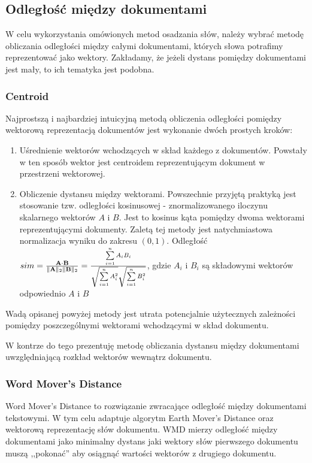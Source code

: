 \documentclass[pl]{minipw} %
\begin{document}
\subsection{Odległość między dokumentami}
W celu wykorzystania omówionych metod osadzania słów, należy wybrać metodę obliczania odległości między całymi dokumentami, których słowa potrafimy reprezentować jako wektory. Zakładamy, że jeżeli dystans pomiędzy dokumentami jest mały, to ich tematyka jest podobna.
\subsubsection{Centroid}
Najprostszą i najbardziej intuicyjną metodą obliczenia odległości pomiędzy wektorową reprezentacją dokumentów jest wykonanie dwóch prostych kroków:
\begin{enumerate}
	\item Uśrednienie wektorów wchodzących w skład każdego z dokumentów. Powstały w ten sposób wektor jest centroidem reprezentującym dokument w przestrzeni wektorowej.
	\item Obliczenie dystansu między wektorami. Powszechnie przyjętą praktyką jest stosowanie tzw. odległości kosinusowej - znormalizowanego iloczynu skalarnego wektorów $A$ i $B$. Jest to kosinus kąta pomiędzy dwoma wektorami reprezentującymi dokumenty. Zaletą tej metody jest natychmiastowa normalizacja wyniku do zakresu $(0, 1)$. Odległość $sim={\mathbf {A} \cdot \mathbf {B}  \over \|\mathbf {A} \|_{2}\|\mathbf {B} \|_{2}}={\frac {\sum \limits _{i=1}^{n}{A_{i}B_{i}}}{{\sqrt {\sum \limits _{i=1}^{n}{A_{i}^{2}}}}{\sqrt {\sum \limits _{i=1}^{n}{B_{i}^{2}}}}}}$,
	gdzie $A_i$ i $B_i$ są składowymi wektorów odpowiednio $A$ i $B$
\end{enumerate}
Wadą opisanej powyżej metody jest utrata potencjalnie użytecznych zależności pomiędzy poszczególnymi wektorami wchodzącymi w skład dokumentu.

W kontrze do tego prezentuję metodę obliczania dystansu między dokumentami uwzględniającą rozkład wektorów wewnątrz dokumentu.

\subsubsection{Word Mover's Distance}
Word Mover's Distance \cite{wmd} to rozwiązanie zwracające odległość między dokumentami tekstowymi. W tym celu adaptuje algorytm Earth Mover's Distance \cite{emd} oraz wektorową reprezentację słów dokumentu. WMD mierzy odległość między dokumentami jako minimalny dystans jaki wektory słów pierwszego dokumentu muszą ,,pokonać'' aby osiągnąć wartości wektorów z drugiego dokumentu.
\end{document}
